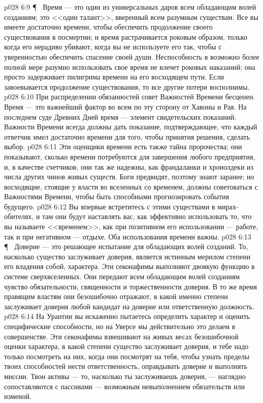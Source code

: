 \vs p028 6:9 \P\ \bibnobreakspace {} Время --- это один из универсальных даров всем обладающим волей созданиям; это <<один талант>>, вверенный всем разумным существам. Все вы имеете достаточно времени, чтобы обеспечить продолжение своего существования в посмертии; и время растрачивается роковым образом, только когда его нерадиво убивают, когда вы не используете его так, чтобы с уверенностью обеспечить спасение своей души. Неспособность в возможно более полной мере разумно использовать свое время не влечет роковых наказаний; она просто задерживает пилигрима времени на его восходящем пути. Если завоевывается продолжение существования, то все другие потери восполнимы.
\vs p028 6:10 При распределении обязанностей совет Важностей Времени бесценен. Время --- это важнейший фактор во всем по эту сторону от Хавоны и Рая. На последнем суде Древних Дней время --- элемент свидетельских показаний. Важности Времени всегда должны дать показание, подтверждающее, что каждый ответчик имел достаточно времени для того, чтобы принятия решения, сделать выбор.
\vs p028 6:11 Эти оценщики времени есть также тайна пророчества; они показывают, сколько времени потребуются для завершения любого предприятия, и, в качестве счетчиков, они так же надежны, как франдаланки и хронолдеки из числа других чинов живых существ. Боги предвидят, поэтому знают заранее; но восходящие, стоящие у власти во вселенных со временем, должны советоваться с Важностями Времени, чтобы быть способными прогнозировать события будущего.
\vs p028 6:12 Вы впервые встретитесь с этими существами в мирах\hyp{}обителях, и там они будут наставлять вас, как эффективно использовать то, что вы называете <<временем>>, как при позитивном его использовании --- работе, так и при негативном --- отдыхе. Оба использования времени важны.
\vs p028 6:13 \P\ \bibnobreakspace {} Доверие --- это решающее испытание для обладающих волей созданий. То, насколько существо заслуживает доверия, является истинным мерилом степени его владения собой, характера. Эти секонафимы выполняют двоякую функцию в системе сверхвселенных. Они передают всем обладающим волей созданиям чувство обязательности, священности и торжественности доверия. В то же время правящим властям они безошибочно отражают, в какой именно степени заслуживает доверия любой кандидат на доверие или ответственную должность.
\vs p028 6:14 На Урантии вы искаженно пытаетесь определить характер и оценить специфические способности, но на Уверсе мы действительно это делаем в совершенстве. Эти секонафимы взвешивают на живых весах безошибочной оценки характера, в какой степени существо заслуживает доверия, и тебе надо только посмотреть на них, когда они посмотрят на тебя, чтобы узнать пределы твоих способностей нести ответственность, оправдывать доверие и выполнять миссии. Твои активы --- то, насколько ты заслуживаешь доверия, --- наглядно сопоставляются с пассивами --- возможным невыполнением обязательств или изменой.

